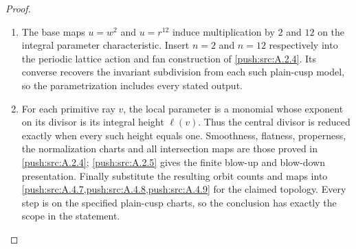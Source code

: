 \begin{proof}
\begin{enumerate}[label=\arabic*.,leftmargin=*]
\item The base maps $u=w^2$ and $u=r^{12}$ induce multiplication by
$2$ and $12$ on the integral parameter characteristic. Insert
$n=2$ and $n=12$ respectively into the periodic lattice action
and fan construction of \ref{push:src:A.2.4}. Its converse
recovers the invariant subdivision from each such plain-cusp
model, so the parametrization includes every stated output.

\item For each primitive ray $v$, the local parameter is a monomial
whose exponent on its divisor is its integral height $\ell(v)$.
Thus the central divisor is reduced exactly when every such
height equals one. Smoothness, flatness, properness, the
normalization charts and all intersection maps are those proved
in \ref{push:src:A.2.4}; \ref{push:src:A.2.5} gives the finite
blow-up and blow-down presentation. Finally substitute the
resulting orbit counts and maps into
\ref{push:src:A.4.7,push:src:A.4.8,push:src:A.4.9} for the
claimed topology. Every step is on the specified plain-cusp
charts, so the conclusion has exactly the scope in the statement.
\end{enumerate}
\end{proof}



